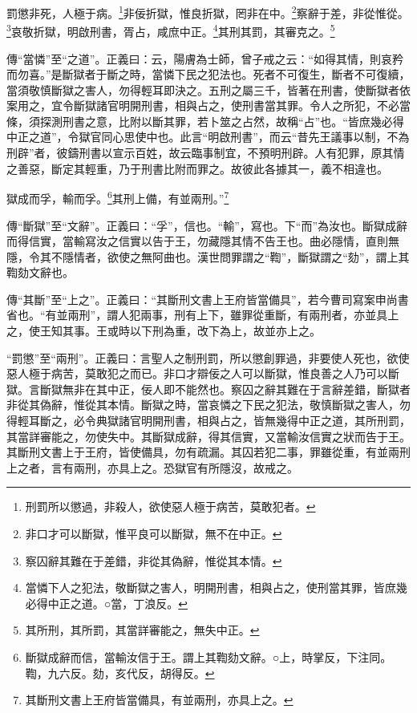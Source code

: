 罰懲非死，人極于病。\footnote{刑罰所以懲過，非殺人，欲使惡人極于病苦，莫敢犯者。}非佞折獄，惟良折獄，罔非在中。\footnote{非口才可以斷獄，惟平良可以斷獄，無不在中正。}察辭于差，非從惟從。\footnote{察囚辭其難在于差錯，非從其偽辭，惟從其本情。}哀敬折獄，明啟刑書，胥占，咸庶中正。\footnote{當憐下人之犯法，敬斷獄之害人，明開刑書，相與占之，使刑當其罪，皆庶幾必得中正之道。○當，丁浪反。}其刑其罰，其審克之。\footnote{其所刑，其所罰，其當詳審能之，無失中正。}



{\noindent\zhuan{}\fzbyks 傳“當憐”至“之道”。正義曰：云，陽膚為士師，曾子戒之云：“如得其情，則哀矜而勿喜。”是斷獄者于斷之時，當憐下民之犯法也。死者不可復生，斷者不可復續，當須敬慎斷獄之害人，勿得輕耳即決之。五刑之屬三千，皆著在刑書，使斷獄者依案用之，宜令斷獄諸官明開刑書，相與占之，使刑書當其罪。令人之所犯，不必當條，須探測刑書之意，比附以斷其罪，若卜筮之占然，故稱“占”也。“皆庶幾必得中正之道”，令獄官同心思使中也。此言“明啟刑書”，而云“昔先王議事以制，不為刑辟”者，彼鑄刑書以宣示百姓，故云臨事制宜，不預明刑辟。人有犯罪，原其情之善惡，斷定其輕重，乃于刑書比附而罪之。故彼此各據其一，義不相違也。 \par}

獄成而孚，輸而孚。\footnote{斷獄成辭而信，當輸汝信于王。謂上其鞫劾文辭。○上，時掌反，下注同。鞫，九六反。劾，亥代反，胡得反。}其刑上備，有並兩刑。”\footnote{其斷刑文書上王府皆當備具，有並兩刑，亦具上之。}

{\noindent\zhuan{}\fzbyks 傳“斷獄”至“文辭”。正義曰：“孚”，信也。“輸”，寫也。下“而”為汝也。斷獄成辭而得信實，當輸寫汝之信實以告于王，勿藏隱其情不告王也。曲必隱情，直則無隱，令其不隱情者，欲使之無阿曲也。漢世問罪謂之“鞫”，斷獄謂之“劾”，謂上其鞫劾文辭也。 \par}

{\noindent\zhuan{}\fzbyks 傳“其斷”至“上之”。正義曰：“其斷刑文書上王府皆當備具”，若今曹司寫案申尚書省也。“有並兩刑”，謂人犯兩事，刑有上下，雖罪從重斷，有兩刑者，亦並具上之，使王知其事。王或時以下刑為重，改下為上，故並亦上之。 \par}

{\noindent\shu{}\fzkt “罰懲”至“兩刑”。正義曰：言聖人之制刑罰，所以懲創罪過，非要使人死也，欲使惡人極于病苦，莫敢犯之而已。非口才辯佞之人可以斷獄，惟良善之人乃可以斷獄。言斷獄無非在其中正，佞人即不能然也。察囚之辭其難在于言辭差錯，斷獄者非從其偽辭，惟從其本情。斷獄之時，當哀憐之下民之犯法，敬慎斷獄之害人，勿得輕耳斷之，必令典獄諸官明開刑書，相與占之，皆無幾得中正之道，其所刑罰，其當詳審能之，勿使失中。其斷獄成辭，得其信實，又當輸汝信實之狀而告于王。其斷刑文書上于王府，皆使備具，勿有疏漏。其囚若犯二事，罪雖從重，有並兩刑上之者，言有兩刑，亦具上之。恐獄官有所隱沒，故戒之。 \par}

